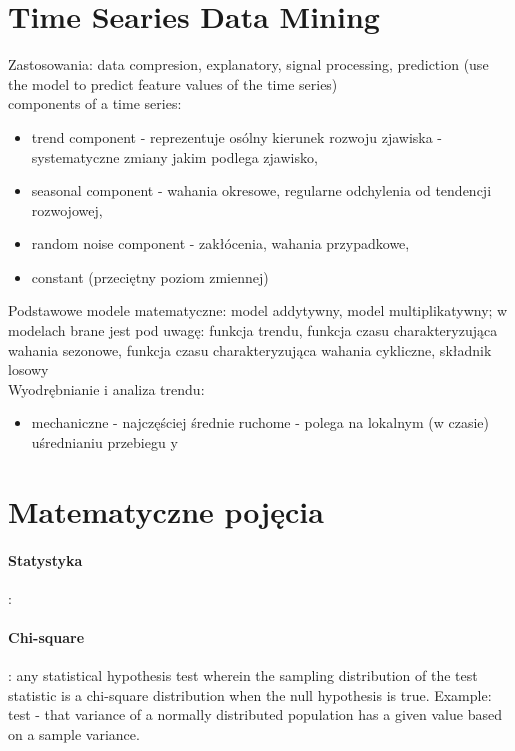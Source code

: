 \documentclass[10pt,a4paper]{article}
\begin{document}
\section{Time Searies Data Mining}
Zastosowania: data compresion, explanatory, signal processing, prediction (use the model to predict feature values of the time series) \\
components of a time series:
\begin{itemize}
  \item trend component - reprezentuje osólny kierunek rozwoju zjawiska - systematyczne zmiany jakim podlega zjawisko,
  \item seasonal component - wahania okresowe, regularne odchylenia od tendencji rozwojowej,
  \item random  noise component - zakłócenia, wahania przypadkowe,
  \item constant (przeciętny poziom zmiennej)
\end{itemize}
Podstawowe modele matematyczne: model addytywny, model multiplikatywny; w modelach brane jest pod uwagę: funkcja trendu, funkcja czasu charakteryzująca wahania sezonowe, funkcja czasu charakteryzująca wahania cykliczne, składnik losowy \\
Wyodrębnianie i analiza trendu:
  \begin{itemize}
    \item mechaniczne - najczęściej średnie ruchome - polega na lokalnym (w czasie) uśrednianiu przebiegu y
  \end{itemize}

\section{Matematyczne pojęcia}
\paragraph{Statystyka} : %
\paragraph{Chi-square} : any statistical hypothesis test wherein the sampling distribution of the test statistic is a chi-square distribution when the null hypothesis is true. Example: test - that variance of a normally distributed population has a given value based on a sample variance. \\
\end{document}
